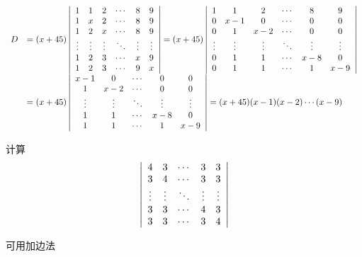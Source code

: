 \begin{frame}
    \pause
    \begin{small}
    \begin{jie}
    $$
    \begin{array}{rl}
      D&=(x+45)\left|
    \begin{array}{cccccc}
      1&1&2&\cdots&8&9\\
      1&x&2&\cdots&8&9\\
      1&2&x&\cdots&8&9\\
      \vdots&\vdots&\vdots&\ddots&\vdots&\vdots\\
      1&2&3&\cdots&x&9\\
      1&2&3&\cdots&9&x
      \end{array}
    \right|=(x+45)\left|
    \begin{array}{cccccc}
      1&1&2&\cdots&8&9\\
      0&x-1&0&\cdots&0&0\\
      0&1&x-2&\cdots&0&0\\
      \vdots&\vdots&\vdots&\ddots&\vdots&\vdots\\
      0&1&1&\cdots&x-8&0\\
      0&1&1&\cdots&1&x-9
      \end{array}
    \right|\\[0.4in]
    &=(x+45)\left|
    \begin{array}{cccccc}      
      x-1&0&\cdots&0&0\\
      1&x-2&\cdots&0&0\\
      \vdots&\vdots&\ddots&\vdots&\vdots\\
      1&1&\cdots&x-8&0\\
      1&1&\cdots&1&x-9
      \end{array}
    \right|=(x+45)(x-1)(x-2)\cdots(x-9)
    \end{array}
    $$
  \end{jie}
  \end{small}
\end{frame}

\begin{frame}
  
    \begin{li}[2012－2013第二学期]
      计算
      $$
      \left|
      \begin{array}{ccccc}
        4&3&\cdots&3&3\\
        3&4&\cdots&3&3\\
        \vdots&\vdots&\ddots&\vdots&\vdots\\
        3&3&\cdots&4&3\\
        3&3&\cdots&3&4
      \end{array}
      \right|
      $$
    \end{li}
    \pause

    \begin{jie}
      可用加边法
    \end{jie}
  
\end{frame}


